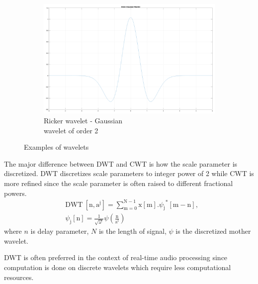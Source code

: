 \begin{enumerate}[label=\textbf{\arabic*})]
\begin{figure}
\begin{subfigure}{.4\textwidth}
          \includegraphics[width=\linewidth]{Figures/order2gaussian.png}
          \caption{Ricker wavelet - Gaussian \\wavelet of order 2}
          \label{Ricker}
        \end{subfigure}

        \caption{Examples of wavelets}
        \label{fig:test}
    \end{figure}
    
    The major difference between DWT and CWT is how the scale parameter is discretized. DWT discretizes scale parameters to integer power of 2 while CWT is more refined since 
    the scale parameter is often raised to different fractional powers.
    \begin{align*} &\text{DWT}\ [\mathrm{n},\mathrm{a}^{\mathrm{j}}]=\sum_{\mathrm{m}=0}^{\mathrm{N}-1}\mathrm{x}[\mathrm{m}].{\psi_{\mathrm{j}}}^{*}[\mathrm{m}-\mathrm{n}],\\ &\psi_{\mathrm{j}}[\mathrm{n}]=\frac{1}{\sqrt{\mathrm{a}^{\mathrm{f}}}}\psi\left(\frac{\mathrm{n}}{\mathrm{a}^{\mathrm{f}}}\right) \tag{2} \end{align*}
    where \(n\) is delay parameter, \(N\) is the length of signal, \(\psi\) is the discretized mother wavelet. 

    DWT is often preferred in the context of real-time audio processing since computation is done on discrete wavelets which require less computational resources.
    

\end{enumerate}
